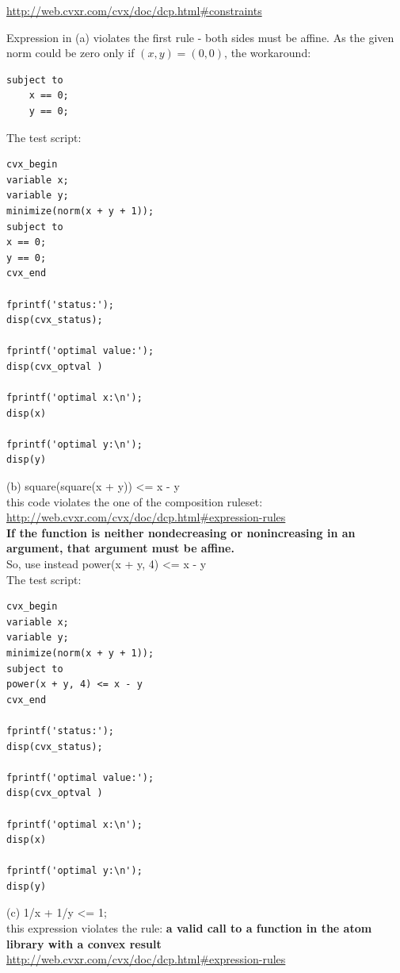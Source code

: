 \documentclass{article}
\begin{document}
\url{http://web.cvxr.com/cvx/doc/dcp.html#constraints}

Expression in (a) violates the first rule - both sides must be affine. As the given norm could be zero only if $(x, y) = (0, 0)$, the workaround:

\begin{verbatim}
subject to
	x == 0;
	y == 0;
\end{verbatim}

The test script: \\
\begin{verbatim}
cvx_begin
variable x;
variable y;
minimize(norm(x + y + 1));
subject to
x == 0;
y == 0;
cvx_end

fprintf('status:'); 
disp(cvx_status);

fprintf('optimal value:'); 
disp(cvx_optval )

fprintf('optimal x:\n'); 
disp(x)

fprintf('optimal y:\n'); 
disp(y)
\end{verbatim}


(b) square(square(x + y)) \textless= x - y\\
this code violates the one of the composition ruleset:\\
\url{http://web.cvxr.com/cvx/doc/dcp.html#expression-rules}\\
{\bf
If the function is neither nondecreasing or nonincreasing in an argument, that argument must be affine.
} \\

So, use instead power(x + y, 4) \textless= x - y\\

The test script: \\
\begin{verbatim}
cvx_begin
variable x;
variable y;
minimize(norm(x + y + 1));
subject to
power(x + y, 4) <= x - y
cvx_end

fprintf('status:'); 
disp(cvx_status);

fprintf('optimal value:'); 
disp(cvx_optval )

fprintf('optimal x:\n'); 
disp(x)

fprintf('optimal y:\n'); 
disp(y)
\end{verbatim}

(c) 1/x + 1/y \textless= 1; \\

this expression violates the rule:
{\bf
a valid call to a function in the atom library with a convex result
} \\
\url{http://web.cvxr.com/cvx/doc/dcp.html#expression-rules}
\end{document}
